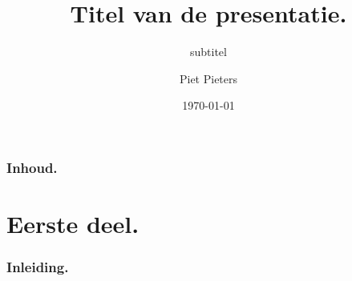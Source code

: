 \documentclass[aspectratio=169]{beamer}
\title[Korte titel]{Titel van de presentatie.}
\subtitle{subtitel}
\author{Piet Pieters}
\date{\today}
\begin{document}

\frame{\maketitle}

\begin{frame}
  \frametitle{Inhoud.}

  \tableofcontents
\end{frame}


\section{Eerste deel.}

\begin{frame}
  \frametitle{Inleiding.}


\end{frame}
\end{document}
